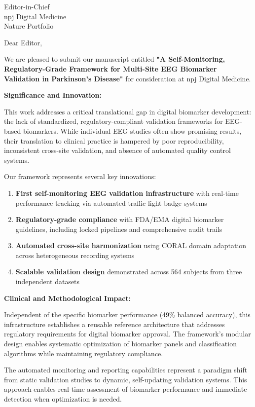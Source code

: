 \documentclass[11pt]{letter}
\begin{document}
\begin{letter}{Editor-in-Chief\\
npj Digital Medicine\\
Nature Portfolio}

\opening{Dear Editor,}

We are pleased to submit our manuscript entitled \textbf{"A Self-Monitoring, Regulatory-Grade Framework for Multi-Site EEG Biomarker Validation in Parkinson's Disease"} for consideration at npj Digital Medicine.

\textbf{Significance and Innovation:}

This work addresses a critical translational gap in digital biomarker development: the lack of standardized, regulatory-compliant validation frameworks for EEG-based biomarkers. While individual EEG studies often show promising results, their translation to clinical practice is hampered by poor reproducibility, inconsistent cross-site validation, and absence of automated quality control systems.

Our framework represents several key innovations:

\begin{enumerate}
\item \textbf{First self-monitoring EEG validation infrastructure} with real-time performance tracking via automated traffic-light badge systems
\item \textbf{Regulatory-grade compliance} with FDA/EMA digital biomarker guidelines, including locked pipelines and comprehensive audit trails
\item \textbf{Automated cross-site harmonization} using CORAL domain adaptation across heterogeneous recording systems
\item \textbf{Scalable validation design} demonstrated across 564 subjects from three independent datasets
\end{enumerate}

\textbf{Clinical and Methodological Impact:}

Independent of the specific biomarker performance (49\% balanced accuracy), this infrastructure establishes a reusable reference architecture that addresses regulatory requirements for digital biomarker approval. The framework's modular design enables systematic optimization of biomarker panels and classification algorithms while maintaining regulatory compliance.

The automated monitoring and reporting capabilities represent a paradigm shift from static validation studies to dynamic, self-updating validation systems. This approach enables real-time assessment of biomarker performance and immediate detection when optimization is needed.


\end{letter}
\end{document}
